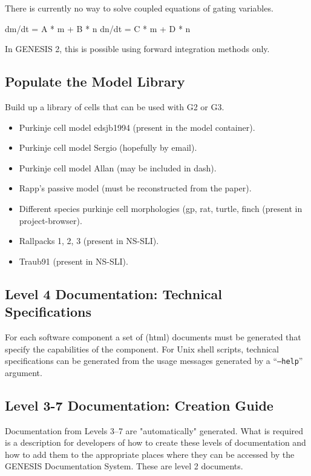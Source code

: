 \documentclass[12pt]{article}
\begin{document}
There is currently no way to solve coupled equations of gating
variables.

dm/dt = A * m + B * n
dn/dt = C * m + D * n

In GENESIS 2, this is possible using forward integration methods only.


\subsection{Populate the Model Library}

Build up a library of cells that can be used with G2 or G3.

\begin{itemize}
\item Purkinje cell model edsjb1994 (present in the model container).
\item Purkinje cell model Sergio (hopefully by email).
\item Purkinje cell model Allan (may be included in dash).
\item Rapp's passive model (must be reconstructed from the paper).
\item Different species purkinje cell morphologies (gp, rat, turtle,
  finch (present in project-browser).
\item Rallpacks 1, 2, 3 (present in NS-SLI).
\item Traub91 (present in NS-SLI).
\end{itemize}

\subsection{Level 4 Documentation: Technical Specifications}

For each software component a set of (html) documents must be
generated that specify the capabilities of the component.  For Unix
shell scripts, technical specifications can be generated from the
usage messages generated by a ``{\tt --help}'' argument.

\subsection{Level 3-7 Documentation: Creation Guide}

Documentation from Levels 3--7 are "automatically" generated. What is
required is a description for developers of how to create these levels
of documentation and how to add them to the appropriate places where
they can be accessed by the GENESIS Documentation System.  These are
level 2 documents.
\end{document}
